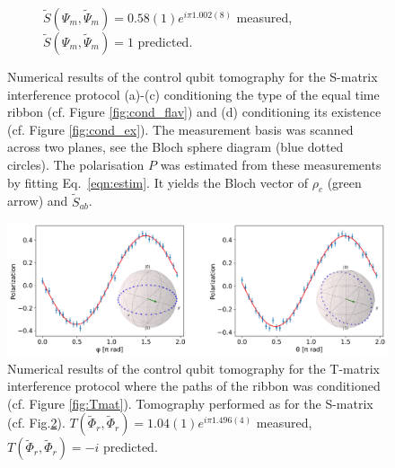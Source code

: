 \documentclass[two column]{article}
\begin{document}
\begin{figure}
\begin{subfigure}{\textwidth}
        \caption{$\tilde{S}(\Psi_m, \tilde{\Psi}_m) = 0.58(1)e^{i\pi 1.002(8)}$ measured, $\tilde{S}(\Psi_m, \tilde{\Psi}_m)=1$ predicted.}
        \label{fig:ex_cond_res_zero}
    \end{subfigure}
    \caption{Numerical results of the control qubit tomography for the S-matrix interference protocol (a)-(c) conditioning the type of the equal time ribbon (cf. Figure \ref{fig:cond_flav}) and (d) conditioning its existence (cf. Figure \ref{fig:cond_ex}). The measurement basis was scanned across two planes, see the Bloch sphere diagram (blue dotted circles). The polarisation $P$ was estimated from these measurements by fitting Eq.~\eqref{eqn:estim}. It yields the Bloch vector of $\rho_c$ (green arrow) and $\tilde S_{ab}$.}
    \label{fig:S_res}
\end{figure}


\begin{figure}
    \centering
    \includegraphics[width=\textwidth]{Figures/t_j_minus.pdf}
    \caption{Numerical results of the control qubit tomography for the T-matrix interference protocol where the paths of the ribbon was conditioned (cf. Figure \ref{fig:Tmat}). Tomography performed as for the S-matrix (cf. Fig.\ref{fig:S_res}).  $T(\tilde{\Phi}_r, \tilde{\Phi}_r) = 1.04(1)e^{i\pi 1.496(4)}$ measured, $T(\tilde{\Phi}_r, \tilde{\Phi}_r) = -i$ predicted.}
    \label{fig:t_mat_results}
\end{figure}
\end{document}
